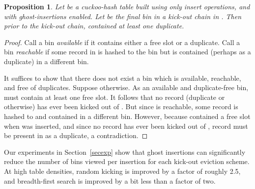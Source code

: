 \documentclass{sig-alternate-05-2015}
\newtheorem{prop}[thm]{Proposition}
\begin{document}
\begin{prop}\label{propghost}
  Let  be a cuckoo-hash table built using only insert operations,
  and with ghost-insertions enabled. Let  be the final bin in a
  kick-out chain in . Then prior to the kick-out chain, 
  contained at least one duplicate.
\end{prop}
\begin{proof}
  Call a bin \emph{available} if it contains either a free slot or a
  duplicate. Call a bin \emph{reachable} if some record in  is
  hashed to the bin but is contained (perhaps as a duplicate) in a
  different bin.

  It suffices to show that there does not exist a bin  which is
  available, reachable, and free of duplicates. Suppose otherwise. As
  an available and duplicate-free bin,  must contain at least one
  free slot. It follows that no record (duplicate or otherwise) has
  ever been kicked out of . But since  is reachable, some record
   is hashed to  and contained in a different bin. However,
  because  contained a free slot when  was inserted, and since
  no record has ever been kicked out of , record  must be
  present in  as a duplicate, a contradiction.
\end{proof}

Our experiments in Section~\ref{secexp} show that ghost insertions can
significantly reduce the number of bins viewed per insertion for each
kick-out eviction scheme. At high table densities, random kicking is
improved by a factor of roughly 2.5, and breadth-first search is
improved by a bit less than a factor of two. 
\end{document}
